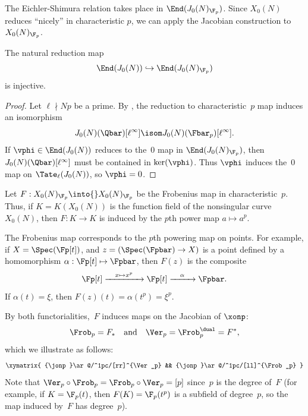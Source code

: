 \documentclass{report}
\begin{document}
The Eichler-Shimura relation takes place in $\End(J_0(N)_{\F_p})$.
Since $X_0(N)$ reduces ``nicely'' in characteristic $p$, we can
apply the Jacobian construction to $X_0(N)_{\F_p}$.
\begin{lemma}\label{lem:red_map_inj}
The natural reduction map
\[
  \End(J_0(N))\hookrightarrow \End(J_0(N)_{\F_p})
\]
is injective.
\end{lemma}
\begin{proof}
Let $\ell\nmid Np$ be a prime.
By \cite[Thm.~1, Lem.~2]{serre-tate},
the reduction to characteristic~$p$ map induces an isomorphism
\[
  J_0(N)(\Qbar)[\ell^\infty] \isom J_0(N)(\Fbar_p)[\ell^\infty].
\]
If $\vphi\in\End(J_0(N))$ reduces to the~$0$ map in
$\End(J_0(N)_{\F_p})$, then $J_0(N)(\Qbar)[\ell^\infty]$
must be contained in $\ker(\vphi)$.  Thus $\vphi$ induces
the~$0$ map on $\Tate_\ell(J_0(N))$, so $\vphi=0$.
\end{proof}

Let $F:X_0(N)_{\F_p}\into{}X_0(N)_{\F_p}$ be the Frobenius map in
characteristic~$p$.
Thus, if $K=K(X_0(N))$ is the function field of the nonsingular
curve $X_0(N)$, then $F:K\to K$ is induced by the $p$th power map
$a\mapsto{}a^p$.
\begin{remark}
The Frobenius map corresponds to the $p$th powering map on points.
For example, if $X=\Spec(\Fp[t])$, and $z=(\Spec(\Fpbar)\to X)$ is a
point defined by a homomorphism $\alpha:\Fp[t]\mapsto \Fpbar$, then
$F(z)$ is the composite
$$\Fp[t] \xrightarrow{\quad x\mapsto x^p\quad }
   \Fp[t] \xrightarrow{\quad \alpha\quad } \Fpbar.$$
If $\alpha(t) = \xi$, then $F(z)(t) = \alpha(t^p) = \xi^p$.
\end{remark}

By both functorialities,~$F$ induces maps on the Jacobian of
$\xonp$:
\[
  \Frob_p=F_{*}\quad\text{and}\quad\Ver_p=\Frob_p^{\dual}=F^{*},
\]
which we illustrate as follows:
\[
  \xymatrix{
   {\jonp}\ar@/^1pc/[rr]^{\Ver_p} && {\jonp}\ar@/^1pc/[ll]^{\Frob_p}
  }
\]
Note that $\Ver_p\circ\Frob_p=\Frob_p\circ\Ver_p=[p]$ since~$p$ is the
degree of~$F$ (for example, if $K=\F_p(t)$, then $F(K)=\F_p(t^p)$
is a subfield of degree~$p$, so the map induced by~$F$
has degree~$p$).
\end{document}
